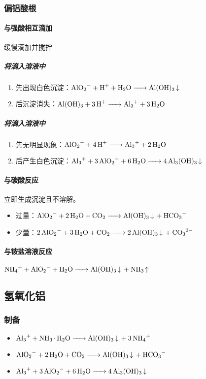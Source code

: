 \documentclass[a4paper]{article}
\begin{document}
	\subsubsection{偏铝酸根}
	\paragraph{与强酸相互滴加}缓慢滴加并搅拌
	\subparagraph{将滴入溶液中}
	\begin{enumerate}
		\item 先出现白色沉淀：$\ce{AlO2- + H+ + H2O -> Al(OH)3 v}\\$
		\item 后沉淀消失：$\ce{Al(OH)3 + 3H+ -> Al3+ + 3H2O}\\$
	\end{enumerate}
	\subparagraph{将滴入溶液中}
	\begin{enumerate}
		\item 先无明显现象：$\ce{AlO2- + 4H+ -> Al3+ + 2H2O}\\$
		\item 后产生白色沉淀：$\ce{Al3+ + 3AlO2- + 6H2O -> 4Al3(OH)3 v}\\$
	\end{enumerate}
	\paragraph{与碳酸反应}
	立即生成沉淀且不溶解。
	\begin{itemize}
		\item {}过量：$\ce{AlO2- + 2H2O + CO2 -> Al(OH)3 v + HCO3-}\\$
		\item {}少量：$\ce{2AlO2- + 3H2O + CO2 -> 2Al(OH)3 v + CO3^2-}\\$
	\end{itemize}
	\paragraph{与铵盐溶液反应}
	$\ce{NH4+ + AlO2- + H2O -> Al(OH)3 v + NH3 ^}\\$
	
	\subsection{氢氧化铝}
	\subsubsection{制备}
	\begin{itemize}
		\item $\ce{Al3+ + NH3*H2O -> Al(OH)3 v + 3NH4+}\\$
		\item $\ce{AlO2- + 2H2O + CO2 -> Al(OH)3 v + HCO3-}\\$
		\item $\ce{Al3+ + 3AlO2- + 6H2O -> 4Al3(OH)3 v}\\$
	\end{itemize}
\end{document}
